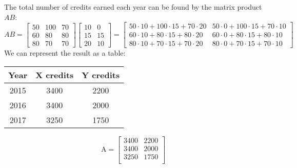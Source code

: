 \documentclass[a4paper, 9pt]{extarticle}
\begin{document}
The total number of credits earned each year can be found by the matrix product $AB$:
$$
  AB =
  \begin{bmatrix}
    50 & 100 & 70 \\
    60 & 80  & 80 \\
    80 & 70  & 70
  \end{bmatrix}
  \begin{bmatrix}
    10 & 0  \\
    15 & 15 \\
    20 & 10
  \end{bmatrix}
  =
  \begin{bmatrix}
    50 \cdot 10 + 100 \cdot 15 + 70 \cdot 20 & 50 \cdot 0 + 100 \cdot 15 + 70 \cdot 10 \\
    60 \cdot 10 + 80 \cdot 15 + 80 \cdot 20  & 60 \cdot 0 + 80 \cdot 15 + 80 \cdot 10  \\
    80 \cdot 10 + 70 \cdot 15 + 70 \cdot 20  & 80 \cdot 0 + 70 \cdot 15 + 70 \cdot 10
  \end{bmatrix}
$$
We can represent the result as a table: \\[2ex]
\begin{minipage}{0.5\textwidth}
  \begin{center}
    \begin{tabularx}{0.6\textwidth}{c | c c}
      \toprule
      Year & X credits & Y credits \\
      \midrule
      2015 & 3400      & 2200      \\
      2016 & 3400      & 2000      \\
      2017 & 3250      & 1750      \\
      \bottomrule
    \end{tabularx}
  \end{center}
\end{minipage}
\begin{minipage}{0.5\textwidth}
  \begin{center}
    $$\mathrm{A}=
      \begin{bmatrix}
        3400 & 2200 \\
        3400 & 2000 \\
        3250 & 1750 \\
      \end{bmatrix}
    $$
  \end{center}
\end{minipage}
\end{document}

